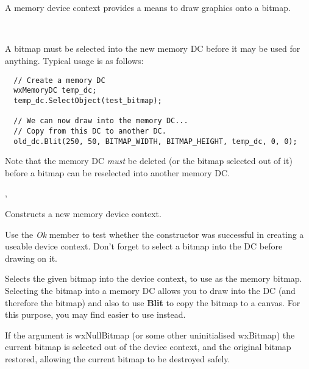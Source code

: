 \section{}\label{wxmemorydc}

A memory device context provides a means to draw graphics onto a bitmap.


\\


A bitmap must be selected into the new memory DC before it may be used
for anything.  Typical usage is as follows:

\begin{verbatim}
  // Create a memory DC
  wxMemoryDC temp_dc;
  temp_dc.SelectObject(test_bitmap);

  // We can now draw into the memory DC...
  // Copy from this DC to another DC.
  old_dc.Blit(250, 50, BITMAP_WIDTH, BITMAP_HEIGHT, temp_dc, 0, 0);
\end{verbatim}

Note that the memory DC {\it must} be deleted (or the bitmap selected out of it) before a bitmap
can be reselected into another memory DC.


, 




Constructs a new memory device context.

Use the {\it Ok} member to test whether the constructor was successful
in creating a useable device context. Don't forget to select a bitmap
into the DC before drawing on it.



Selects the given bitmap into the device context, to use as the memory
bitmap. Selecting the bitmap into a memory DC allows you to draw into
the DC (and therefore the bitmap) and also to use {\bf Blit} to copy
the bitmap to a canvas. For this purpose, you may find \rtfsp
easier to use instead.

If the argument is wxNullBitmap (or some other uninitialised wxBitmap) the current bitmap is selected out of the device
context, and the original bitmap restored, allowing the current bitmap to
be destroyed safely.

